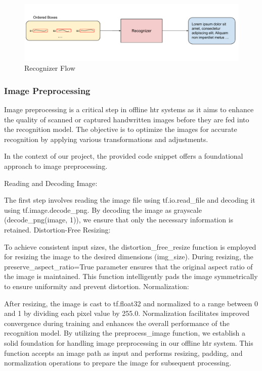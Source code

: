 \begin{figure}[!ht]
	\centering
	\includegraphics[trim={0cm 0cm 0 0cm}, width=1\textwidth]{./Chapter5/Figures/Recognizer}
	\caption{Recognizer Flow}
	\label{fig:Recognizer}
\end{figure}




\subsubsection{Image Preprocessing}
Image preprocessing is a critical step in offline \gls{htr} systems as it aims to enhance the quality of scanned or captured handwritten images before they are fed into the recognition model. The objective is to optimize the images for accurate recognition by applying various transformations and adjustments.

In the context of our project, the provided code snippet offers a foundational approach to image preprocessing.

Reading and Decoding Image:

The first step involves reading the image file using tf.io.read\_file and decoding it using tf.image.decode\_png.
By decoding the image as grayscale (decode\_png(image, 1)), we ensure that only the necessary information is retained.
Distortion-Free Resizing:

To achieve consistent input sizes, the distortion\_free\_resize function is employed for resizing the image to the desired dimensions (img\_size).
During resizing, the preserve\_aspect\_ratio=True parameter ensures that the original aspect ratio of the image is maintained.
This function intelligently pads the image symmetrically to ensure uniformity and prevent distortion.
Normalization:

After resizing, the image is cast to tf.float32 and normalized to a range between 0 and 1 by dividing each pixel value by 255.0.
Normalization facilitates improved convergence during training and enhances the overall performance of the recognition model.
By utilizing the preprocess\_image function, we establish a solid foundation for handling image preprocessing in our offline \gls{htr} system. This function accepts an image path as input and performs resizing, padding, and normalization operations to prepare the image for subsequent processing.


